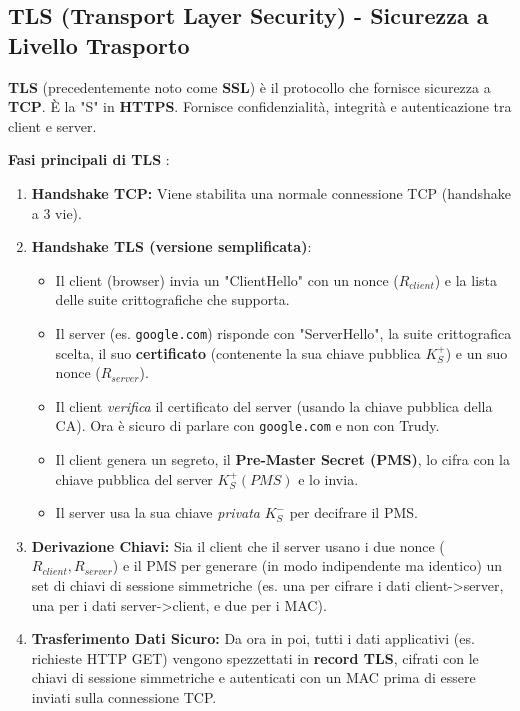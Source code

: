 \begin{enumerate}
\subsection{TLS (Transport Layer Security) - Sicurezza a Livello Trasporto}
\textbf{TLS} (precedentemente noto come \textbf{SSL}) è il protocollo che fornisce sicurezza a \textbf{TCP}. È la "S" in \textbf{HTTPS}. Fornisce confidenzialità, integrità e autenticazione tra client e server.

\noindent \textbf{Fasi principali di TLS} :
\begin{enumerate}
    \item \textbf{Handshake TCP:} Viene stabilita una normale connessione TCP (handshake a 3 vie).
    \item \textbf{Handshake TLS (versione semplificata)}:
        \begin{itemize}
            \item Il client (browser) invia un "ClientHello" con un nonce ($R_{client}$) e la lista delle suite crittografiche che supporta.
            \item Il server (es. \texttt{google.com}) risponde con "ServerHello", la suite crittografica scelta, il suo \textbf{certificato} (contenente la sua chiave pubblica $K_S^+$) e un suo nonce ($R_{server}$).
            \item Il client \textit{verifica} il certificato del server (usando la chiave pubblica della CA). Ora è sicuro di parlare con \texttt{google.com} e non con Trudy.
            \item Il client genera un segreto, il \textbf{Pre-Master Secret (PMS)}, lo cifra con la chiave pubblica del server $K_S^+(PMS)$ e lo invia.
            \item Il server usa la sua chiave \textit{privata} $K_S^-$ per decifrare il PMS.
        \end{itemize}
    \item \textbf{Derivazione Chiavi:} Sia il client che il server usano i due nonce ($R_{client}, R_{server}$) e il PMS per generare (in modo indipendente ma identico) un set di chiavi di sessione simmetriche (es. una per cifrare i dati client->server, una per i dati server->client, e due per i MAC).
    \item \textbf{Trasferimento Dati Sicuro:} Da ora in poi, tutti i dati applicativi (es. richieste HTTP GET) vengono spezzettati in \textbf{record TLS}, cifrati con le chiavi di sessione simmetriche e autenticati con un MAC prima di essere inviati sulla connessione TCP.
\end{enumerate}


\end{enumerate}
